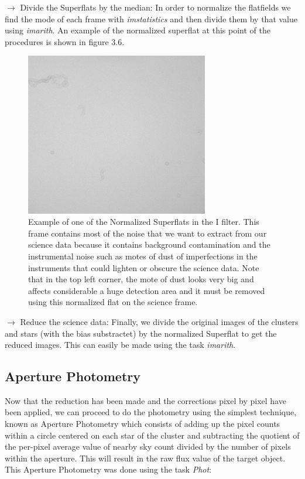 $\rightarrow$ Divide the Superflats by the median: In order to normalize the flatfields we find the mode of each frame with \textit{imstatistics} and then divide them by that value using \textit{imarith}. An example of the normalized superflat at this point of the procedures is shown in figure 3.6.

\begin{figure}[H]
\centering
\includegraphics[width=8cm]{images/flat_I.png}
\caption[Normalized Superflat for the filter I]{Example of one of the Normalized Superflats in the I filter. This frame contains most of the noise that we want to extract from our science data because it contains background contamination and the instrumental noise such as motes of dust of imperfections in the instruments that could lighten or obscure the science data. Note that in the top left corner, the mote of dust looks very big and affects considerable a huge detection area and it must be removed using this normalized flat on the science frame.}
\end{figure}

$\rightarrow$ Reduce the science data: Finally, we divide the original images of the clusters and stars (with the bias substractet) by the normalized Superflat to get the reduced images. This can easily be made using the task \textit{imarith}.

\subsection{Aperture Photometry}

Now that the reduction has been made and the corrections pixel by pixel have been applied, we can proceed to do the photometry using the simplest technique, known as Aperture Photometry which consists of adding up the pixel counts within a circle centered on each star of the cluster and subtracting the quotient of the per-pixel average value of nearby sky count divided by the number of pixels within the aperture. This will result in the raw flux value of the target object. This Aperture Photometry was done using the task \textit{Phot}:

